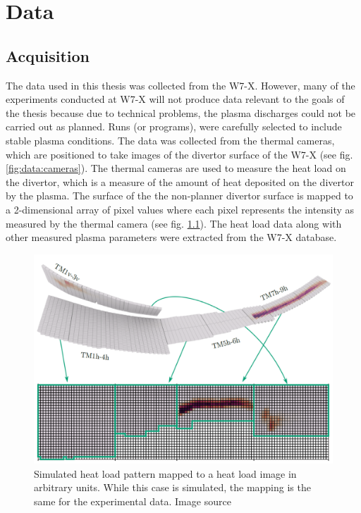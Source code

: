 
\chapter{Data}

\label{sec:Data Acquisition}
\section{Acquisition}

The data used in this thesis was collected from the W7-X. However, many of the experiments conducted at W7-X will not produce data relevant to the goals of the thesis because due to technical problems, the plasma discharges could not be carried out as planned. Runs (or programs), were carefully selected to include stable plasma conditions. The data was collected from the thermal cameras, which are positioned to take images of the divertor surface of the W7-X (see fig. \ref{fig:data:cameras}). The thermal cameras are used to measure the heat load on the divertor, which is a measure of the amount of heat deposited on the divertor by the plasma. The surface of the the non-planner divertor surface is mapped to a 2-dimensional array of pixel values where each pixel represents the intensity as measured by the thermal camera (see fig. \ref{fig:data:mapping}). The heat load data along with other measured plasma parameters were extracted from the W7-X database.

\begin{figure}[htb]
	\includegraphics[width=\textwidth]{images/mapping.png}
	\caption{Simulated heat load pattern mapped to a heat load image in arbitrary units. While this case is simulated, the mapping is the same for the experimental data. Image source \cite{Blatzheim_2019}}
	\label{fig:data:mapping}
\end{figure}

